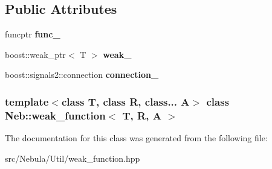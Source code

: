 \subsection*{\-Public \-Attributes}
\begin{DoxyCompactItemize}
\item 
\hypertarget{classNeb_1_1weak__function_a74862697c1231b8623d9e800f74cee8d}{funcptr {\bfseries func\-\_\-}}\label{classNeb_1_1weak__function_a74862697c1231b8623d9e800f74cee8d}

\item 
\hypertarget{classNeb_1_1weak__function_a9d75df0eaa7aaf40973f67f6583e5d69}{boost\-::weak\-\_\-ptr$<$ \-T $>$ {\bfseries weak\-\_\-}}\label{classNeb_1_1weak__function_a9d75df0eaa7aaf40973f67f6583e5d69}

\item 
\hypertarget{classNeb_1_1weak__function_a02370593823d9be862e4177a6d3b0edd}{boost\-::signals2\-::connection {\bfseries connection\-\_\-}}\label{classNeb_1_1weak__function_a02370593823d9be862e4177a6d3b0edd}

\end{DoxyCompactItemize}
\subsubsection*{template$<$class T, class R, class... \-A$>$ class Neb\-::weak\-\_\-function$<$ T, R, A $>$}



\-The documentation for this class was generated from the following file\-:\begin{DoxyCompactItemize}
\item 
src/\-Nebula/\-Util/weak\-\_\-function.\-hpp\end{DoxyCompactItemize}
